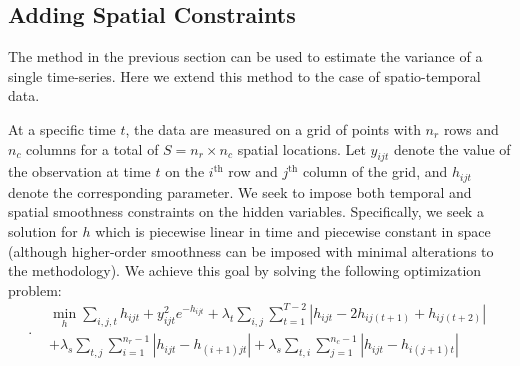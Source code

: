 \documentclass[letterpaper]{article} %
\newcommand{\attn}[1]{\textcolor{red}{TODO: #1}}
\begin{document}

\subsection{Adding Spatial Constraints}
\label{sec:exten}

The method in the previous section can be used to estimate the
variance of a single time-series. Here we extend this
method to the case of spatio-temporal data. 

At a specific time $t$, the data are measured on a grid of points with
$n_r$ rows and $n_c$ columns for a total of $S=n_r\times n_c$ spatial
locations. Let $y_{ijt}$ denote the value of the 
observation at time $t$ on the $i^\text{th}$ row and $j^\text{th}$
column of the grid, and $h_{ijt}$ denote the corresponding
parameter. We seek to impose both temporal and spatial smoothness 
constraints on the hidden variables. Specifically, we seek a solution
for $h$ which is piecewise linear in time and piecewise constant in
space (although higher-order smoothness can be imposed with minimal
alterations to the methodology). We achieve this goal
by solving the following optimization problem: 
{\scriptsize
\begin{equation}
\label{eq:l1tf_var_st}.
\begin{aligned}
&\min_h \sum_{i,j,t}h_{ijt}+y_{ijt}^2e^{-h_{ijt}} +\lambda_t
\sum_{i,j} \sum_{t=1}^{T-2}
\left|h_{ijt}-2h_{ij(t+1)}+h_{ij(t+2)}\right|\\ 
&+\lambda_s \sum_{t,j} \sum_{i=1}^{n_r-1} \left|h_{ijt}-h_{(i+1)jt}\right|
+\lambda_s \sum_{t,i} \sum_{j=1}^{n_c-1} \left|h_{ijt}-h_{i(j+1)t}\right|
\end{aligned}
\end{equation}
}%
\end{document}
